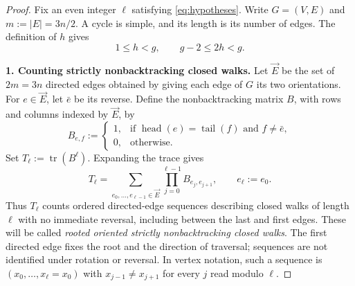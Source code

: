 \documentclass[11pt,a4paper]{article}
\DeclareMathOperator{\tr}{tr}
\DeclareMathOperator{\head}{head}
\DeclareMathOperator{\tail}{tail}
\begin{document}
\begin{proof}
Fix an even integer $\ell$ satisfying \eqref{eq:hypotheses}.
Write $G=(V,E)$ and $m:=|E|=3n/2$. A cycle is simple, and its length
is its number of edges. The definition of $h$ gives
\begin{equation}\label{eq:h}
  1\le h<g,
  \qquad g-2\le 2h<g.
\end{equation}

\medskip
\noindent\textbf{1. Counting strictly nonbacktracking closed walks.}
Let $\vec E$ be the set of $2m=3n$ directed edges obtained by giving
each edge of $G$ its two orientations. For $e\in\vec E$, let $\bar e$
be its reverse. Define the nonbacktracking matrix $B$, with rows and
columns indexed by $\vec E$, by
\[
  B_{e,f}:=
  \begin{cases}
    1,&\text{if }\head(e)=\tail(f)\text{ and }f\ne\bar e,\\
    0,&\text{otherwise}.
  \end{cases}
\]
Set $T_\ell:=\tr(B^\ell)$. Expanding the trace gives
\begin{equation}\label{eq:trace-count}
  T_\ell=
  \sum_{e_0,\ldots,e_{\ell-1}\in\vec E}
    \prod_{j=0}^{\ell-1}B_{e_j,e_{j+1}},
  \qquad e_\ell:=e_0.
\end{equation}
Thus $T_\ell$ counts ordered directed-edge sequences describing
closed walks of length $\ell$ with no immediate reversal, including
between the last and first edges. These will be called
\emph{rooted oriented strictly nonbacktracking closed walks}.
The first directed edge fixes the root and the direction of traversal;
sequences are not identified under rotation or reversal. In vertex
notation, such a sequence is $(x_0,\ldots,x_\ell=x_0)$ with
$x_{j-1}\ne x_{j+1}$ for every $j$ read modulo $\ell$.


\end{proof}
\end{document}
